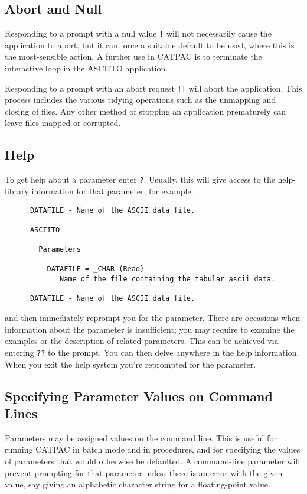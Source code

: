 \subsection{Abort and Null}

Responding to a prompt with a null value {\tt !} will not necessarily
cause the application to abort, but it can force a suitable default to
be used, where this is the most-sensible action. A further use in CATPAC
is to terminate the interactive loop in the ASCIITO application.

Responding to a prompt with an abort request {\tt !!} will abort the
application.  This process includes the various tidying operations
such as the unmapping and closing of files.  Any other method of
stopping an application prematurely can leave files mapped or corrupted. 

\subsection{Help}
\label{se:parhelp}

To get help about a parameter enter {\tt ?}.  Usually, this will give
access to the help-library
information for that parameter, for example:
\begin{verbatim}
      DATAFILE - Name of the ASCII data file.
 
      ASCIITO
 
        Parameters
 
          DATAFILE = _CHAR (Read)
             Name of the file containing the tabular ascii data.
 
      DATAFILE - Name of the ASCII data file.
\end{verbatim}

and then immediately reprompt you for the parameter.  There are occasions when
information about the parameter is insufficient; you may require to examine the
examples or the description of related parameters.  This can be achieved via
entering {\tt ??} to the prompt. You can then delve anywhere in the help
information.  When you exit the help system you're reprompted for the
parameter.


\subsection{Specifying Parameter Values on Command Lines}
\label{se:cmdlindef}
Parameters may be assigned values on the command line. This is useful
for running {\small CATPAC} in batch mode and in procedures, and for
specifying the values of parameters that would otherwise be defaulted. A
command-line parameter will prevent prompting for that parameter unless
there is an error with the given value, say giving an alphabetic
character string for a floating-point value. 

